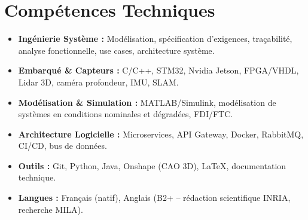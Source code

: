 \documentclass[a4paper,11pt]{article}
\begin{document}
\section{Compétences Techniques}
\begin{itemize}[leftmargin=*, nosep]
    \item \small{\textbf{Ingénierie Système :} Modélisation, spécification d'exigences, traçabilité, analyse fonctionnelle, use cases, architecture système.}
    \item \small{\textbf{Embarqué \& Capteurs :} C/C++, STM32, Nvidia Jetson, FPGA/VHDL, Lidar 3D, caméra profondeur, IMU, SLAM.}
    \item \small{\textbf{Modélisation \& Simulation :} MATLAB/Simulink, modélisation de systèmes en conditions nominales et dégradées, FDI/FTC.}
    \item \small{\textbf{Architecture Logicielle :} Microservices, API Gateway, Docker, RabbitMQ, CI/CD, bus de données.}
    \item \small{\textbf{Outils :} Git, Python, Java, Onshape (CAO 3D), LaTeX, documentation technique.}
    \item \small{\textbf{Langues :} Français (natif), Anglais (B2+ -- rédaction scientifique INRIA, recherche MILA).}
\end{itemize}

\end{document}
